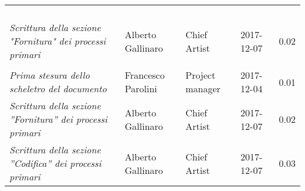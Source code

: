 \newpage 
\section*{}
\begin{table}[H]
	\centering
	\begin{tabular}{p{4cm}|C{3cm}|C{3cm}|R{2.5cm}|R{2cm}}
		
		 & & & & \\
		
		
		\emph{}	 & & & & \\
		\hline
		
		& & & & \\
		\hline
		
		& & & & \\
		\hline
		\emph{Scrittura della sezione "Fornitura" dei processi primari} & Alberto Gallinaro & Chief Artist & 2017-12-07 & 0.02 \\
		& & & & \\
		
		\emph{Prima stesura dello scheletro del documento} & Francesco Parolini & Project manager & 2017-12-04 & 0.01 \\
		
		\emph{Scrittura della sezione ''Fornitura'' dei processi primari} & Alberto Gallinaro & Chief Artist & 2017-12-07 & 0.02 \\
		\emph{Scrittura della sezione ''Codifica'' dei processi primari} & Alberto Gallinaro & Chief Artist & 2017-12-07 & 0.03 \\
		
	\end{tabular}
	
\end{table}


\clearpage
